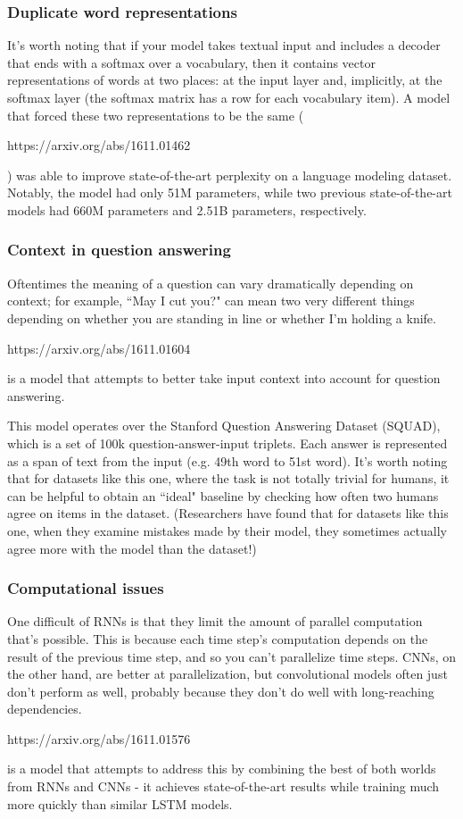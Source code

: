 \subsubsection{Duplicate word representations}
It's worth noting that if your model takes textual input and includes a decoder that ends with a softmax over a vocabulary, then it contains vector representations of words at two places: at the input layer and, implicitly, at the softmax layer (the softmax matrix has a row for each vocabulary item). A model that forced these two representations to be the same (\begin{tt}https://arxiv.org/abs/1611.01462\end{tt}) was able to improve state-of-the-art perplexity on a language modeling dataset. Notably, the model had only 51M parameters, while two previous state-of-the-art models had 660M parameters and 2.51B parameters, respectively.

\subsubsection{Context in question answering}
Oftentimes the meaning of a question can vary dramatically depending on context; for example, ``May I cut you?" can mean two very different things depending on whether you are standing in line or whether I'm holding a knife. \begin{tt}https://arxiv.org/abs/1611.01604\end{tt} is a model that attempts to better take input context into account for question answering.

This model operates over the Stanford Question Answering Dataset (SQUAD), which is a set of 100k question-answer-input triplets. Each answer is represented as a span of text from the input (e.g. 49th word to 51st word). It's worth noting that for datasets like this one, where the task is not totally trivial for humans, it can be helpful to obtain an ``ideal" baseline by checking how often two humans agree on items in the dataset. (Researchers have found that for datasets like this one, when they examine mistakes made by their model, they sometimes actually agree more with the model than the dataset!)

\subsubsection{Computational issues}
One difficult of RNNs is that they limit the amount of parallel computation that's possible. This is because each time step's computation depends on the result of the previous time step, and so you can't parallelize time steps. CNNs, on the other hand, are better at parallelization, but convolutional models often just don't perform as well, probably because they don't do well with long-reaching dependencies. \begin{tt}https://arxiv.org/abs/1611.01576\end{tt} is a model that attempts to address this by combining the best of both worlds from RNNs and CNNs - it achieves state-of-the-art results while training much more quickly than similar LSTM models.

